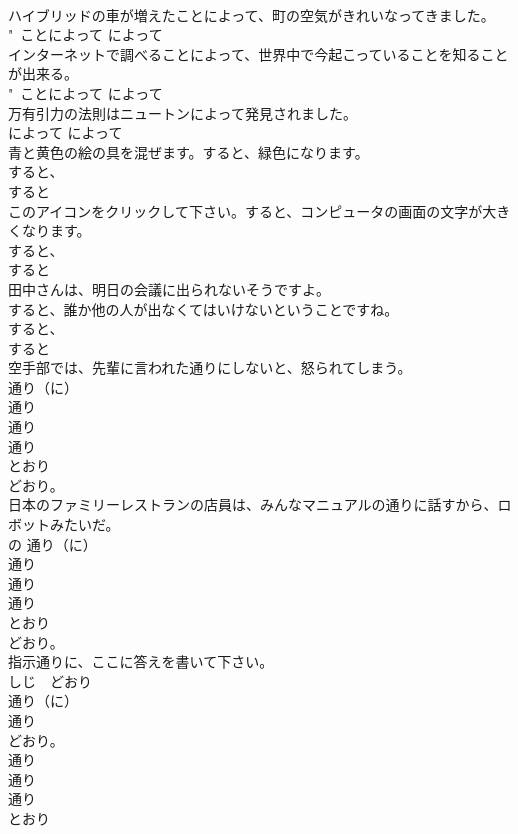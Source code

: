 \documentclass[8pt]{extreport}
\begin{document}
\begin{CJK}{UTF8}{min}
{\\	ハイブリッドの車が増えたことによって、町の空気がきれいなってきました。	
\\	"~ことによって によって 
\\	インターネットで調べることによって、世界中で今起こっていることを知ることが出来る。	
\\	"~ことによって によって 
\\	万有引力の法則はニュートンによって発見されました。	
\\	によって によって 
\\	青と黄色の絵の具を混ぜます。すると、緑色になります。	
\\	すると、
\\	すると 
\\	このアイコンをクリックして下さい。すると、コンピュータの画面の文字が大きくなります。	
\\	すると、
\\	すると 
\\	田中さんは、明日の会議に出られないそうですよ。 
\\	すると、誰か他の人が出なくてはいけないということですね。	
\\	すると、
\\	すると 
\\	空手部では、先輩に言われた通りにしないと、怒られてしまう。	
\\	通り（に） 
\\	通り 
\\	通り 
\\	通り 
\\	とおり 
\\	どおり。
\\	日本のファミリーレストランの店員は、みんなマニュアルの通りに話すから、ロボットみたいだ。	
\\	の 通り（に） 
\\	通り 
\\	通り 
\\	通り 
\\	とおり 
\\	どおり。
\\	指示通りに、ここに答えを書いて下さい。	
\\	しじ　どおり	
\\	通り（に） 
\\	通り 
\\	どおり。 
\\	通り 
\\	通り 
\\	通り 
\\	とおり 
}
\end{CJK}
\end{document}
